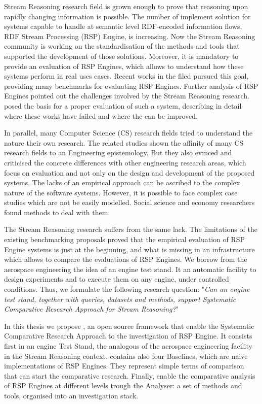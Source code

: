 Stream Reasoning research field is grown enough to prove that reasoning upon rapidly changing information is possible. The number of  implement solution for systems capable to handle at semantic level RDF-encoded information flows, RDF Stream Processing (RSP) Engine, is increasing. Now the Stream Reasoning community is working on the standardisation of the methods and tools that supported the development of those solutions. Moreover, it is mandatory to provide an evaluation of RSP Engines, which allows to understand how these systems perform in real uses cases. 
Recent works in the filed \cite{Zhang2012, LePhuoc2012c, DBLP:conf/semweb/DellAglioCBCV13} pursued this goal, providing many benchmarks for evaluating RSP Engines. Further analysis of RSP Engines \cite{DBLP:conf/esws/ScharrenbachUMVB13} pointed out the challenges involved by the Stream Reasoning research. \cite{DBLP:conf/esws/ScharrenbachUMVB13} posed the basis for a proper evaluation of such a system, describing in detail where these works have failed and where the can be improved.

In parallel, many  Computer Science (CS) research fields tried to understand the nature their own research. The related studies \cite{Tichy:1995:EEC:209090.209093, Wainer:2009:EEC:1518331.1518552} shown the affinity of many CS research fields to an Engineering epistemology. But they also evinced and criticised the concrete differences with other engineering research areas, which focus on evaluation and not only on the design and development of the proposed systems. The lacks of an empirical approach can be ascribed to the complex nature of the software systems. However, it is possible to face complex case studies which are not be easily modelled. Social science and economy researchers found methods to deal with them.

The Stream Reasoning research suffers from the same lack. The limitations of the existing benchmarking proposals proved that the empirical evaluation of RSP Engine systems is just at the beginning, and what is missing in an infrastructure which allows to compare the evaluations of RSP Engines. We borrow from the aerospace engineering the idea of an engine test stand. It an automatic facility to design experiments and to execute them on any engine, under controlled conditions. %
Thus, we formulate the following research question: "\textit{Can an engine test stand, together with queries, datasets and methods, support Systematic Comparative Research Approach for Stream Reasoning?}"

In this thesis we propose \namens, an open source framework that enable the Systematic Comparative Research Approach to the investigation of RSP Engine. It consists first in an engine Test Stand, the analogous of the aerospace engineering facility in the Stream Reasoning context. \name contains also four Baselines, which are naive implementations of RSP Engines. They represent  simple terms of comparison that can start the comparative research. Finally, \name enable the comparative analysis of RSP Engines at different levels trough the Analyser: a set of methods and tools, organised into an investigation stack.
